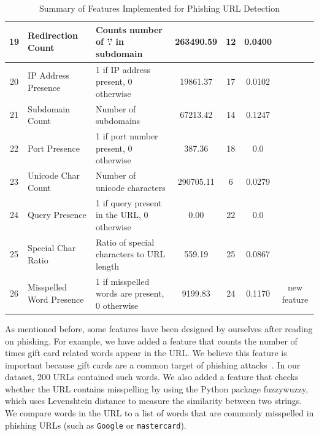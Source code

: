\documentclass{article}
\begin{document}
\begin{table}[H]
\begin{adjustwidth}{-3cm}{}
\begin{tabular}{|c|p{4cm}|p{5cm}|c|c|c|c|}
                19           & Redirection Count               & Counts number of '.' in subdomain              & 263490.59          & 12                   & 0.0400                   &                                                 \\ \hline
                20           & IP Address Presence             & 1 if IP address present, 0 otherwise           & 19861.37           & 17                   & 0.0102                   & \cite{PhishSafe} \cite{LexicalFeatureSelection} \\ \hline
                21           & Subdomain Count                 & Number of subdomains                           & 67213.42           & 14                   & 0.1247                   & \cite{PhishSafe}                                \\ \hline
                22           & Port Presence                   & 1 if port number present, 0 otherwise          & 387.36             & 18                   & 0.0                      & \cite{LexicalFeatureSelection}                  \\ \hline
                23           & Unicode Char Count              & Number of unicode characters                   & 290705.11          & 6                    & 0.0279                   & \cite{LexicalFeatureSelection}                  \\ \hline
                24           & Query Presence                  & 1 if query present in the URL, 0 otherwise     & 0.00               & 22                   & 0.0                      & \cite{LexicalFeatureSelection}                  \\ \hline
                25           & Special Char Ratio              & Ratio of special characters to URL length      & 559.19             & 25                   & 0.0867                   &\cite{PhishingLoginURLDetection} \\ \hline
                26           & Misspelled Word Presence        & 1 if misspelled words are present, 0 otherwise & 9199.83 & 24 & 0.1170 &  new feature \\ \hline
            \end{tabular}
            \caption{Summary of Features Implemented for Phishing URL Detection}
            \label{tab:features}
         \end{adjustwidth}
    \end{table}

    As mentioned before, some features have been designed by ourselves after reading on phishing.
    For example, we have added a feature that counts the number of times gift card related words appear in the URL.
    We believe this feature is important because gift cards are a common target of phishing attacks~\cite{PhishingActivityTrendsReport}.
    In our dataset, 200 URLs contained such words.
    We also added a feature that checks whether the URL contains misspelling by using the Python package fuzzywuzzy, which uses Levenshtein distance to measure the similarity between two strings.
    We compare words in the URL to a list of words that are commonly misspelled in phishing URLs (such as \texttt{Google} or \texttt{mastercard}).
\end{document}
